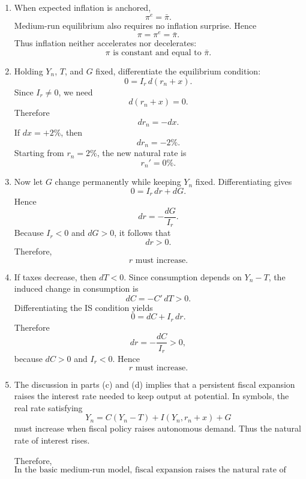 \documentclass[12pt]{article}
\begin{document}
\begin{enumerate}[label=(\alph*)]
    \item
    When expected inflation is anchored,
    \[
    \pi^e=\bar{\pi}.
    \]
    Medium-run equilibrium also requires no inflation surprise. Hence
    \[
    \pi=\pi^e=\bar{\pi}.
    \]
    Thus inflation neither accelerates nor decelerates:
    \[
    \boxed{\pi \text{ is constant and equal to } \bar{\pi}.}
    \]

    \item
    Holding \(Y_n\), \(T\), and \(G\) fixed, differentiate the equilibrium condition:
    \[
    0 = I_r\, d(r_n+x).
    \]
    Since \(I_r\neq 0\), we need
    \[
    d(r_n+x)=0.
    \]
    Therefore
    \[
    dr_n=-dx.
    \]
    If \(dx=+2\%\), then
    \[
    dr_n=-2\%.
    \]
    Starting from \(r_n=2\%\), the new natural rate is
    \[
    \boxed{r_n'=0\%.}
    \]

    \item
    Now let \(G\) change permanently while keeping \(Y_n\) fixed. Differentiating gives
    \[
    0 = I_r\,dr + dG.
    \]
    Hence
    \[
    dr = -\frac{dG}{I_r}.
    \]
    Because \(I_r<0\) and \(dG>0\), it follows that
    \[
    dr>0.
    \]
    Therefore,
    \[
    \boxed{r \text{ must increase.}}
    \]

    \item
    If taxes decrease, then \(dT<0\). Since consumption depends on \(Y_n-T\), the induced change in consumption is
    \[
    dC = -C'\,dT >0.
    \]
    Differentiating the IS condition yields
    \[
    0 = dC + I_r\,dr.
    \]
    Therefore
    \[
    dr = -\frac{dC}{I_r} >0,
    \]
    because \(dC>0\) and \(I_r<0\). Hence
    \[
    \boxed{r \text{ must increase.}}
    \]

    \item
    The discussion in parts (c) and (d) implies that a persistent fiscal expansion raises the interest rate needed to keep output at potential. In symbols, the real rate satisfying
    \[
    Y_n=C(Y_n-T)+I(Y_n,r_n+x)+G
    \]
    must increase when fiscal policy raises autonomous demand. Thus the natural rate of interest rises.

    Therefore,
    \[
    \boxed{\text{In the basic medium-run model, fiscal expansion raises the natural rate of interest.}}
    \]
\end{enumerate}

\newpage
\end{document}
